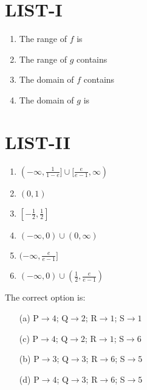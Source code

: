 \documentclass[journal,12pt,twocolumn,article]{IEEEtran}
\theoremstyle{remark}
\begin{document}
\begin{multicols}{2}
	\section*{LIST-I}
	\begin{enumerate}[label=(\Alph*), start=16]
	\item The range of $f$ is
	\item The range of $g$ contains
	\item The domain of $f$ contains
	\item The domain of $g$ is 
\end{enumerate}
\columnbreak
	\section*{LIST-II}
\begin{enumerate}
	\item $(-\infty,\frac{1}{1-e}]\cup[\frac{e}{e-1},\infty)$
	\item $(0,1)$
	\item $[-\frac{1}{2},\frac{1}{2}]$
	\item $(-\infty,0)\cup(0,\infty)$
	\item $(-\infty,\frac{e}{e-1}]$
	\item $(-\infty,0)\cup(\frac{1}{2},\frac{e}{e-1})$
\end{enumerate}
\end{multicols}
The correct option is:
\begin{multicols}{2}
	\begin{enumerate}
		\item[(a)] P$\to4$; Q$\to2$; R$\to1$; S$\to1$
		\item[(c)] P$\to4$; Q$\to2$; R$\to1$; S$\to6$
	\end{enumerate}
	\columnbreak
	\begin{enumerate}
		\item[(b)] P$\to3$; Q$\to3$; R$\to6$; S$\to5$
		\item[(d)] P$\to4$; Q$\to3$; R$\to6$; S$\to5$
	\end{enumerate}
\end{multicols}
\twocolumn
\end{document}
